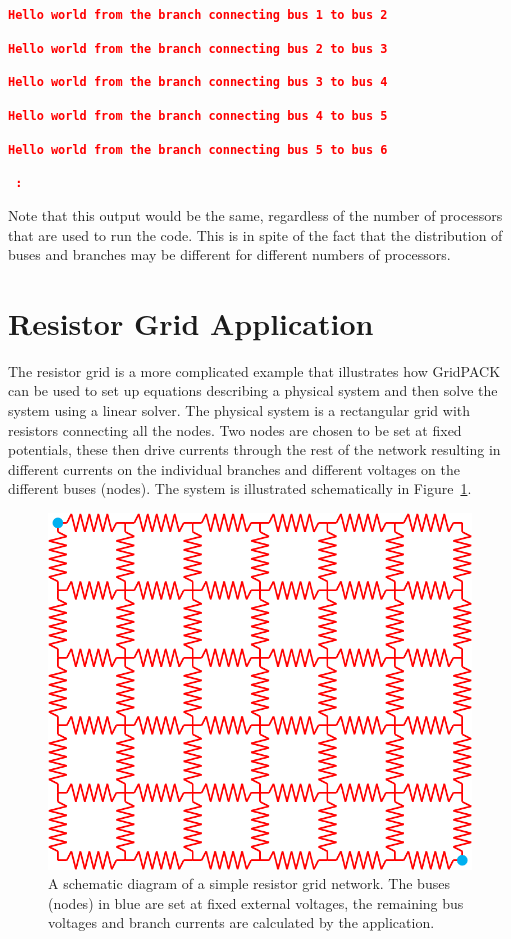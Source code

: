 \documentclass[12pt]{report} %
\begin{document}
\textcolor{red}{\texttt{\textbf{Hello world from the branch connecting bus 1 to bus 2}}}

\textcolor{red}{\texttt{\textbf{Hello world from the branch connecting bus 2 to bus 3}}}

\textcolor{red}{\texttt{\textbf{Hello world from the branch connecting bus 3 to bus 4}}}

\textcolor{red}{\texttt{\textbf{Hello world from the branch connecting bus 4 to bus 5}}}

\textcolor{red}{\texttt{\textbf{Hello world from the branch connecting bus 5 to bus 6}}}

\textcolor{red}{\texttt{\textbf{    :}}}

Note that this output would be the same, regardless of the number of processors that are used to run the code. This is in spite of the fact that the distribution of buses and branches may be different for different numbers of processors.

\section{Resistor Grid Application}

The resistor grid is a more complicated example that illustrates how GridPACK can be used to set up equations describing a physical system and then solve the system using a linear solver. The physical system is a rectangular grid with resistors connecting all the nodes. Two nodes are chosen to be set at fixed potentials, these then drive currents through the rest of the network resulting in different currents on the individual branches and different voltages on the different buses (nodes). The system is illustrated schematically in Figure~\ref{fig:fig-14}.

\begin{figure}
  \centering
    \includegraphics*[width=5in, keepaspectratio=true]{Fig14}
  \caption{A schematic diagram of a simple resistor grid network. The buses (nodes) in blue are set at fixed external voltages, the remaining bus voltages and branch currents are calculated by the application.}
  \label{fig:fig-14}
\end{figure}
\end{document}
